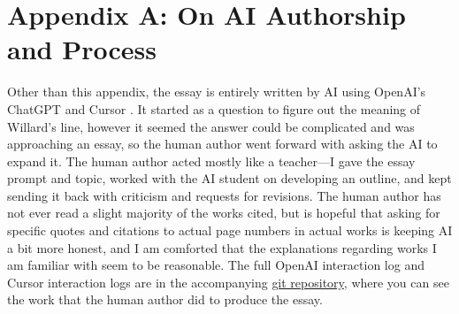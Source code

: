 \section*{Appendix A: On AI Authorship and Process}
\label{app:ai-authorship}

Other than this appendix, the essay is entirely written by AI using OpenAI's ChatGPT
\parencite{OpenAIChatGPT2024} and Cursor \parencite{CursorAI2024}. It started as a question
to figure out the meaning of Willard's line, however it seemed the answer could be complicated
and was approaching an essay, so the human author went forward with asking the AI to expand
it. The human author acted mostly like a teacher---I gave the essay prompt and topic, worked
with the AI student on developing an outline, and kept sending it back with criticism and
requests for revisions. The human author has not ever read a slight majority of the works
cited, but is hopeful that asking for specific quotes and citations to actual page numbers in
actual works is keeping AI a bit more honest, and I am comforted that the explanations
regarding works I am familiar with seem to be reasonable. The full OpenAI interaction log and
Cursor interaction logs are in the accompanying
\href{https://github.com/jmalicki/apocalypse-now-essay/tree/main/interaction-logs}{git
	repository}, where you can see the work that the human author did to produce the essay.
